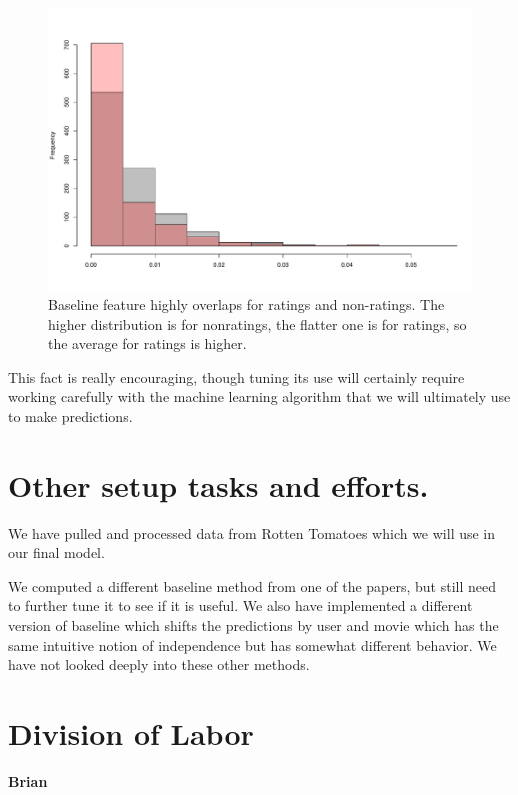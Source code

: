 \documentclass[11pt]{article}
\begin{document}
\begin{figure}
\includegraphics[scale=.5]{baseline.pdf}

\caption{Baseline feature highly overlaps for ratings and non-ratings. The higher distribution
is for nonratings, the flatter one is for ratings, so the average for ratings is higher.}
\end{figure}

This fact is really encouraging, though tuning its use will certainly 
require working carefully with the machine learning algorithm
that we will ultimately use to make predictions.

\section{Other setup tasks and efforts.}

We have pulled and processed data from Rotten Tomatoes which
we will use in our final model. 

We computed a different baseline method from one of the papers, 
but still need to further tune it to see if it is useful.
We also have implemented a different version of baseline
which shifts the predictions by user and movie which 
has the same intuitive notion of independence but
has somewhat different behavior.  We have not looked
deeply into these other methods.

\section{Division of Labor}

{\bf Brian}
\end{document}
